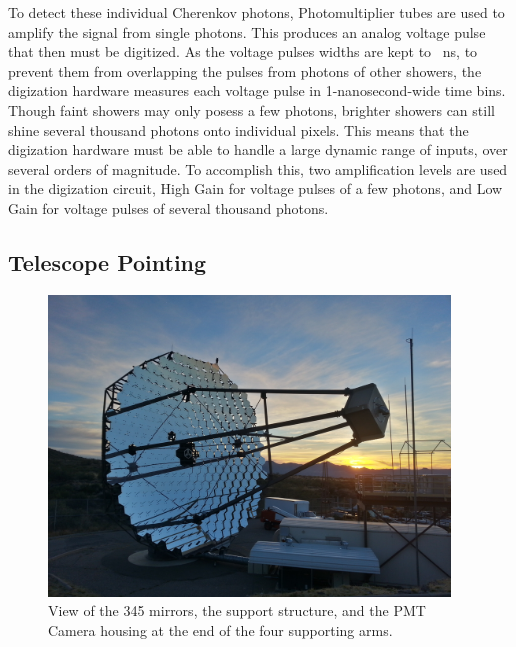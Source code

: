 To detect these individual Cherenkov photons, Photomultiplier tubes are used to amplify the signal from single photons.
This produces an analog voltage pulse that then must be digitized.
As the voltage pulses widths are kept to ~ns, to prevent them from overlapping the pulses from photons of other showers, the digization hardware measures each voltage pulse in 1-nanosecond-wide time bins.
Though faint showers may only posess a few photons, brighter showers can still shine several thousand photons onto individual pixels.
This means that the digization hardware must be able to handle a large dynamic range of inputs, over several orders of magnitude.
To accomplish this, two amplification levels are used in the digization circuit, High Gain for voltage pulses of a few photons, and Low Gain for voltage pulses of several thousand photons.

\subsection{Telescope Pointing}

\begin{figure}[h]
  \begin{center}
    \includegraphics[width=0.95\textwidth]{images/single_telescope}
    \caption[Single Telescope]{View of the 345 mirrors, the support structure, and the PMT Camera housing at the end of the four supporting arms.}\label{fig:davcottel}
  \end{center}
\end{figure}

